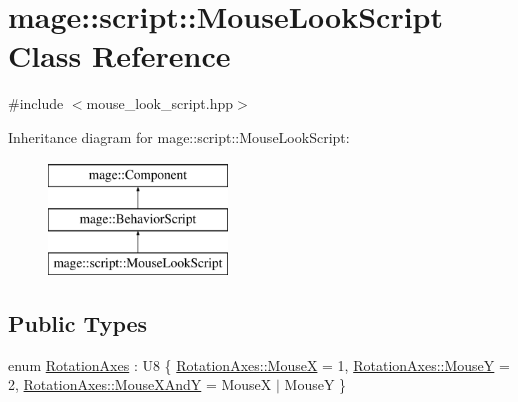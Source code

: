\hypertarget{classmage_1_1script_1_1_mouse_look_script}{}\section{mage\+:\+:script\+:\+:Mouse\+Look\+Script Class Reference}
\label{classmage_1_1script_1_1_mouse_look_script}


{\ttfamily \#include $<$mouse\+\_\+look\+\_\+script.\+hpp$>$}

Inheritance diagram for mage\+:\+:script\+:\+:Mouse\+Look\+Script\+:\begin{figure}[H]
\begin{center}
\leavevmode
\includegraphics[height=3.000000cm]{classmage_1_1script_1_1_mouse_look_script}
\end{center}
\end{figure}
\subsection*{Public Types}
\begin{DoxyCompactItemize}
\item 
enum \hyperlink{classmage_1_1script_1_1_mouse_look_script_a662018db64c5dc84a958eb1c6123a829}{Rotation\+Axes} \+: U8 \{ \hyperlink{classmage_1_1script_1_1_mouse_look_script_a662018db64c5dc84a958eb1c6123a829abf27c48f8a38ed19eeeba089dd8d3ba1}{Rotation\+Axes\+::\+MouseX} = 1, 
\hyperlink{classmage_1_1script_1_1_mouse_look_script_a662018db64c5dc84a958eb1c6123a829a73843207a289db41b16a5bb8254ca425}{Rotation\+Axes\+::\+MouseY} = 2, 
\hyperlink{classmage_1_1script_1_1_mouse_look_script_a662018db64c5dc84a958eb1c6123a829a109431b32c091e8a7ad541546c66c522}{Rotation\+Axes\+::\+Mouse\+X\+AndY} = MouseX $\vert$ MouseY
 \}
\end{DoxyCompactItemize}
